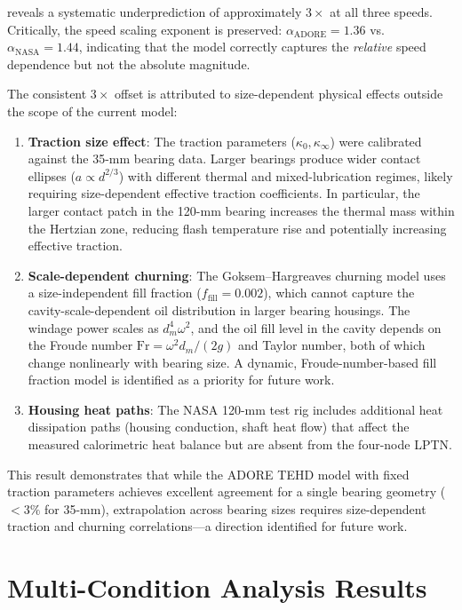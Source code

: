 \documentclass[preprint,12pt]{elsarticle}
\begin{document}
 reveals a systematic underprediction of approximately $3\times$ at all three speeds. Critically, the speed scaling exponent is preserved: $\alpha_{\text{ADORE}} = 1.36$ vs.\ $\alpha_{\text{NASA}} = 1.44$, indicating that the model correctly captures the \emph{relative} speed dependence but not the absolute magnitude.

The consistent $3\times$ offset is attributed to size-dependent physical effects outside the scope of the current model:
\begin{enumerate}
    \item \textbf{Traction size effect}: The traction parameters ($\kappa_0, \kappa_\infty$) were calibrated against the 35-mm bearing data. Larger bearings produce wider contact ellipses ($a \propto d^{2/3}$) with different thermal and mixed-lubrication regimes, likely requiring size-dependent effective traction coefficients. In particular, the larger contact patch in the 120-mm bearing increases the thermal mass within the Hertzian zone, reducing flash temperature rise and potentially increasing effective traction.
    \item \textbf{Scale-dependent churning}: The Goksem--Hargreaves churning model uses a size-independent fill fraction ($f_{\text{fill}} = 0.002$), which cannot capture the cavity-scale-dependent oil distribution in larger bearing housings. The windage power scales as $d_m^4 \omega^2$, and the oil fill level in the cavity depends on the Froude number $\text{Fr} = \omega^2 d_m / (2g)$ and Taylor number, both of which change nonlinearly with bearing size. A dynamic, Froude-number-based fill fraction model is identified as a priority for future work.
    \item \textbf{Housing heat paths}: The NASA 120-mm test rig includes additional heat dissipation paths (housing conduction, shaft heat flow) that affect the measured calorimetric heat balance but are absent from the four-node LPTN.
\end{enumerate}

This result demonstrates that while the ADORE TEHD model with fixed traction parameters achieves excellent agreement for a single bearing geometry ($<3\%$ for 35-mm), extrapolation across bearing sizes requires size-dependent traction and churning correlations---a direction identified for future work.


\section{Multi-Condition Analysis Results}
\label{sec:results}
\end{document}
